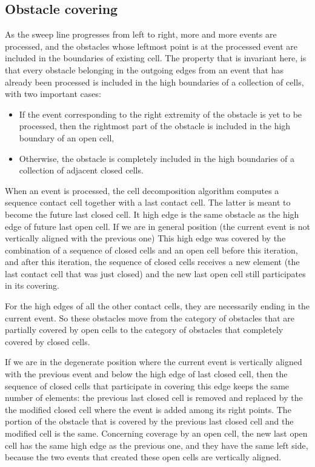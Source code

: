 \documentclass[a4paper, USenglish, cleveref, autoref, thm-restate]{lipics-v2021}
\begin{document}
\subsection{Obstacle covering}
As the sweep line progresses from left to right, more and more events
are processed, and the obstacles whose leftmost point is at the
processed event are included in the boundaries of existing cell.  The
property that is invariant here, is that every obstacle belonging in
the outgoing edges from an event that has already been processed is
included in the high boundaries of a collection of cells, with two
important cases:
\begin{itemize}
\item If the event corresponding to the right extremity of the
  obstacle is yet to be processed, then the rightmost part of the
  obstacle is included in the high boundary of an open cell,
\item Otherwise, the obstacle is completely included in the high
  boundaries of a collection of adjacent closed cells.
\end{itemize}

When an event is processed, the cell decomposition algorithm computes
a sequence contact cell together with a last contact cell.  The latter
is meant to become the future last closed cell.  It high edge is the
same obstacle as the high edge of future last open cell.  If we
are in general position (the current event is not vertically aligned
with the previous one) This high
edge was covered by the combination of a sequence of closed cells and
an open cell before this iteration, and after this iteration, the
sequence of closed cells receives a new element (the last contact cell
that was just closed) and the new last open cell still participates in
its covering.

For the high edges of all the other contact cells, they are
necessarily ending in the current event.  So these obstacles move from
the category of obstacles that are partially covered by open cells to
the category of obstacles that completely covered by closed cells.

If we are in the degenerate position where the current event is
vertically aligned with the previous event and below the high edge of
last closed cell, then the sequence of closed cells that participate
in covering this edge keeps the same number of elements: the previous last
closed cell is removed and replaced by the the modified closed cell
where the event is added among its right points.  The portion of the
obstacle that is covered by the previous last closed cell and the
modified cell is the same.  Concerning coverage by an open cell, the
new last open cell has the same high edge as the previous one, and
they have the same left side, because the two events that created
these open cells are vertically aligned.
\end{document}
